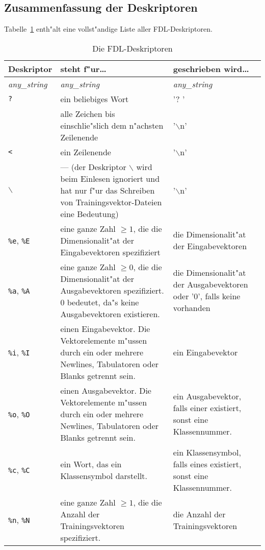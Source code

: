 \subsection{Zusammenfassung der Deskriptoren}

Tabelle~\ref{descriptors} enth"alt eine vollst"andige Liste aller 
FDL-Deskriptoren.

\begin{table}[thb]
\begin{tabular}{l|p{5.8cm}|p{5.8cm}}
{\bf Deskriptor} & {\bf steht f"ur\ldots} & {\bf geschrieben wird\ldots} \\
\hline
{\it any\_string} & {\it any\_string} & {\it any\_string} \\
{\tt ?} & ein beliebiges Wort &
'? ' \\
{\tt *} & alle Zeichen bis einschlie"slich dem n"achsten Zeilenende & 
'$\backslash$n' \\
{\tt <} & ein Zeilenende & '$\backslash$n' \\
{\tt $\backslash$} & --- (der Deskriptor {\tt $\backslash$} wird beim
Einlesen ignoriert und hat nur f"ur das Schreiben von 
Trai\-nings\-vek\-tor-Dateien eine Bedeutung) & '$\backslash$n' \\
{\tt \%e}, {\tt \%E} & eine ganze Zahl $\geq 1$, die die Dimensionalit"at der
Ein\-gabe\-vek\-toren spezifiziert & die Dimensionalit"at der 
Ein\-gabe\-vektoren \\
{\tt \%a}, {\tt \%A} & eine ganze Zahl $\geq 0$, die die Dimensionalit"at der
Ausgabevektoren spezifiziert. 0 bedeutet, da"s keine Ausgabevektoren
existieren. & die Dimensionalit"at der Ausgabevektoren oder '0', falls 
keine vorhanden \\
{\tt \%i}, {\tt \%I} & einen Eingabevektor. Die Vektorelemente m"ussen durch
ein oder mehrere Newlines, Tabulatoren oder Blanks getrennt sein. 
& ein Eingabevektor \\
{\tt \%o}, {\tt \%O} & einen Ausgabevektor. Die Vektorelemente m"ussen durch
ein oder mehrere Newlines, Tabulatoren oder Blanks getrennt sein.
  & ein Ausgabevektor, falls einer 
existiert, sonst eine Klassennummer. \\
{\tt \%c}, {\tt \%C} & ein Wort, das ein Klassensymbol darstellt. &
ein Klassensymbol, falls eines existiert, sonst eine Klassennummer. \\
{\tt \%n}, {\tt \%N} & eine ganze Zahl $\geq 1$, die die 
Anzahl der Trainingsvektoren
spezifiziert. & die Anzahl der Trainingsvektoren     
\end{tabular}  
\caption{\label{descriptors} Die FDL-Deskriptoren}
\end{table}

